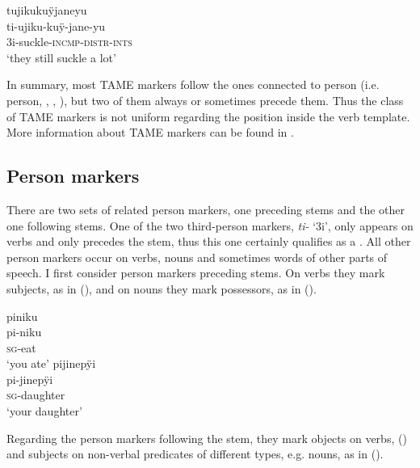 \ea\label{ex:FirstTAME-6}
\begingl
\glpreamble tujikukuÿjaneyu\\
\gla ti-ujiku-kuÿ-jane-yu\\
\glb 3i-suckle-\textsc{incmp}-\textsc{distr}-\textsc{ints}\\
\glft ‘they still suckle a lot’
\endgl
\trailingcitation{[rxx-e120511l.364]}
\xe

In summary, most TAME markers follow the ones connected to person (i.e. person, , , ), but two of them always or sometimes precede them. Thus the class of TAME markers is not uniform regarding the position inside the verb template. More information about TAME markers can be found in .

\subsection{Person markers}\label{sec:AffClPerson}

There are two sets of related person markers, one preceding stems and the other one following stems. One of the two third-person markers, \textit{ti-} ‘3i’, only appears on verbs and only precedes the stem, thus this one certainly qualifies as a . All other person markers occur on verbs, nouns and sometimes words of other parts of speech. I first consider person markers preceding stems. On verbs they mark subjects, as in (), and on nouns they mark possessors, as in ().

\ea\label{ex:firstPersonMarkers}
  \ea\label{ex:firstPersonMarkers.1}
\begingl
\glpreamble piniku\\
\gla pi-niku\\
\textsc{sg}-eat\\
\glft ‘you ate’
\endgl
  \ex\label{ex:firstPersonMarkers.2}
\begingl
\glpreamble pijinepÿi\\
\gla pi-jinepÿi \\
\textsc{sg}-daughter\\
\glft ‘your daughter’
\endgl
\z
\xe
{}

Regarding the person markers following the stem, they mark objects on verbs, () and subjects on non-verbal predicates of different types, e.g. nouns, as in ().

